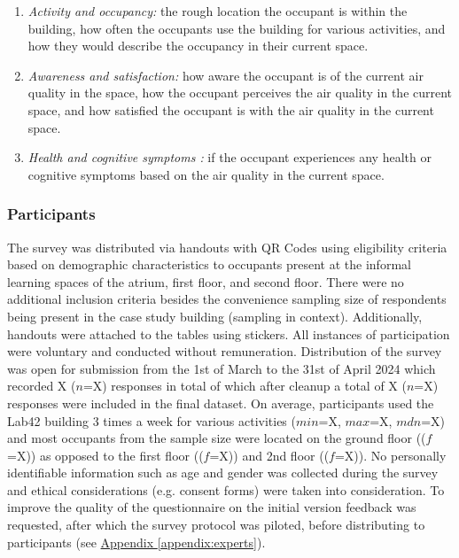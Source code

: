 \begin{enumerate}
  \item \textit{Activity and occupancy:} the rough location the occupant is within the building, how often the occupants use the building for various activities, and how they would describe the occupancy in their current space.
  \item \textit{Awareness and satisfaction:} how aware the occupant is of the current air quality in the space, how the occupant perceives the air quality in the current space, and how satisfied the occupant is with the air quality in the current space.
  \item \textit{Health and cognitive symptoms :} if the occupant experiences any health or cognitive symptoms based on the air quality in the current space.
\end{enumerate}


\subsubsection{Participants}
The survey was distributed via handouts with QR Codes using eligibility criteria based on demographic characteristics to occupants present at the informal learning spaces of the atrium, first floor, and second floor. There were no additional inclusion criteria besides the convenience sampling size of respondents being present in the case study building (sampling in context). Additionally, handouts were attached to the tables using stickers. All instances of participation were voluntary and conducted without remuneration. Distribution of the survey was open for submission from the 1st of March to the 31st of April 2024 which recorded X ($n$=X) responses in total of which after cleanup a total of X ($n$=X) responses were included in the final dataset. On average, participants used the Lab42 building 3 times a week for various activities ($min$=X, $max$=X, $mdn$=X) and most occupants from the sample size were located on the ground floor (($f$=X)) as opposed to the first floor (($f$=X)) and 2nd floor (($f$=X)). No personally identifiable information such as age and gender was collected during the survey and ethical considerations (e.g. consent forms) were taken into consideration. To improve the quality of the questionnaire on the initial version feedback was requested, after which the survey protocol was piloted, before distributing to participants (see \hyperref[appendix:experts]{Appendix \ref*{appendix:experts}}). 

